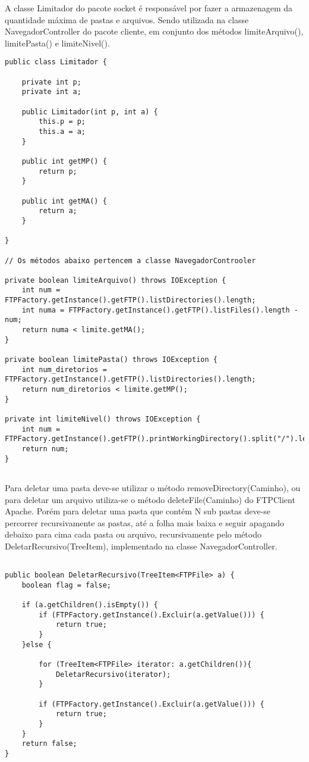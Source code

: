 \documentclass[12pt]{article}
\begin{document}
A classe Limitador do pacote socket é responsável por fazer a armazenagem da quantidade máxima de pastas e arquivos. Sendo utilizada na classe NavegadorController do pacote cliente, em conjunto dos métodos limiteArquivo(), limitePasta()  e limiteNivel().
 
 \begin{lstlisting}
public class Limitador {

	private int p;
	private int a;
	
	public Limitador(int p, int a) {
		this.p = p;
		this.a = a;
	}
	
	public int getMP() {
		return p;
	}
	
	public int getMA() {
		return a;
	}

}

// Os métodos abaixo pertencem a classe NavegadorControoler

private boolean limiteArquivo() throws IOException {
	int num = FTPFactory.getInstance().getFTP().listDirectories().length;
	int numa = FTPFactory.getInstance().getFTP().listFiles().length - num;
	return numa < limite.getMA();
}

private boolean limitePasta() throws IOException {
	int num_diretorios = FTPFactory.getInstance().getFTP().listDirectories().length;
	return num_diretorios < limite.getMP();
}

private int limiteNivel() throws IOException {
	int num = FTPFactory.getInstance().getFTP().printWorkingDirectory().split("/").length;
	return num;
}


\end{lstlisting}
	Para deletar uma pasta deve-se utilizar o método removeDirectory(Caminho), ou para deletar um arquivo utiliza-se o método deleteFile(Caminho) do FTPClient Apache. Porém para deletar uma pasta que contém N sub pastas deve-se percorrer recursivamente as pastas, até a folha mais baixa e seguir apagando debaixo para cima cada pasta ou arquivo, recursivamente pelo método DeletarRecursivo(TreeItem), implementado na classe NavegadorController.  
\begin{lstlisting}

public boolean DeletarRecursivo(TreeItem<FTPFile> a) {
	boolean flag = false;
	
	if (a.getChildren().isEmpty()) {
		if (FTPFactory.getInstance().Excluir(a.getValue())) {
			return true;
		}
	}else {
	
		for (TreeItem<FTPFile> iterator: a.getChildren()){
			DeletarRecursivo(iterator);
		}
		
		if (FTPFactory.getInstance().Excluir(a.getValue())) {
			return true;
		}
	}
	return false;
}
\end{lstlisting}
\end{document}

